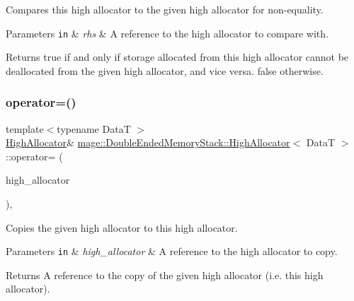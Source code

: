 Compares this high allocator to the given high allocator for non-\/equality.


\begin{DoxyParams}[1]{Parameters}
\mbox{\tt in}  & {\em rhs} & A reference to the high allocator to compare with. \\
\hline
\end{DoxyParams}
\begin{DoxyReturn}{Returns}
{\ttfamily true} if and only if storage allocated from this high allocator cannot be deallocated from the given high allocator, and vice versa. {\ttfamily false} otherwise. 
\end{DoxyReturn}
\hypertarget{structmage_1_1_double_ended_memory_stack_1_1_high_allocator_a7b0319849971e5d3dba9074184560500}{}\label{structmage_1_1_double_ended_memory_stack_1_1_high_allocator_a7b0319849971e5d3dba9074184560500} 
\subsubsection{\texorpdfstring{operator=()}{operator=()}\hspace{0.1cm}{\footnotesize\ttfamily [1/2]}}
{\footnotesize\ttfamily template$<$typename DataT $>$ \\
\hyperlink{structmage_1_1_double_ended_memory_stack_1_1_high_allocator}{High\+Allocator}\& \hyperlink{structmage_1_1_double_ended_memory_stack_1_1_high_allocator}{mage\+::\+Double\+Ended\+Memory\+Stack\+::\+High\+Allocator}$<$ DataT $>$\+::operator= (\begin{DoxyParamCaption}\item[{const \hyperlink{structmage_1_1_double_ended_memory_stack_1_1_high_allocator}{High\+Allocator}$<$ DataT $>$ \&}]{high\+\_\+allocator }\end{DoxyParamCaption})\hspace{0.3cm}{\ttfamily [delete]}, {\ttfamily [noexcept]}}

Copies the given high allocator to this high allocator.


\begin{DoxyParams}[1]{Parameters}
\mbox{\tt in}  & {\em high\+\_\+allocator} & A reference to the high allocator to copy. \\
\hline
\end{DoxyParams}
\begin{DoxyReturn}{Returns}
A reference to the copy of the given high allocator (i.\+e. this high allocator). 
\end{DoxyReturn}
\hypertarget{structmage_1_1_double_ended_memory_stack_1_1_high_allocator_a3c668fe7ff9ae1efd3743461253e7923}{}\label{structmage_1_1_double_ended_memory_stack_1_1_high_allocator_a3c668fe7ff9ae1efd3743461253e7923} 
